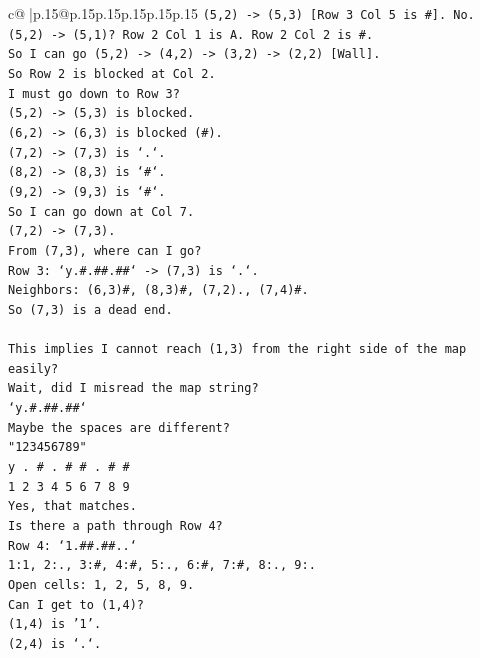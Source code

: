 \documentclass{article}
\begin{document}
{\begin{supertabular}{c@{$\;$}|p{.15\linewidth}@{}p{.15\linewidth}p{.15\linewidth}p{.15\linewidth}p{.15\linewidth}p{.15\linewidth}}
{{{\texttt{(5,2) {-}> (5,3) {[}Row 3 Col 5 is \#{]}. No.} \\
\texttt{(5,2) {-}> (5,1)? Row 2 Col 1 is A. Row 2 Col 2 is \#.} \\
\texttt{So I can go (5,2) {-}> (4,2) {-}> (3,2) {-}> (2,2) {[}Wall{]}.} \\
\texttt{So Row 2 is blocked at Col 2.} \\
\texttt{I must go down to Row 3?} \\
\texttt{(5,2) {-}> (5,3) is blocked.} \\
\texttt{(6,2) {-}> (6,3) is blocked (\#).} \\
\texttt{(7,2) {-}> (7,3) is `.`.} \\
\texttt{(8,2) {-}> (8,3) is `\#`.} \\
\texttt{(9,2) {-}> (9,3) is `\#`.} \\
\texttt{So I can go down at Col 7.} \\
\texttt{(7,2) {-}> (7,3).} \\
\texttt{From (7,3), where can I go?} \\
\texttt{Row 3: `y.\#.\#\#.\#\#` {-}> (7,3) is `.`.} \\
\texttt{Neighbors: (6,3)\#, (8,3)\#, (7,2)., (7,4)\#.} \\
\texttt{So (7,3) is a dead end.} \\
\\ 
\texttt{This implies I cannot reach (1,3) from the right side of the map easily?} \\
\texttt{Wait, did I misread the map string?} \\
\texttt{`y.\#.\#\#.\#\#`} \\
\texttt{Maybe the spaces are different?} \\
\texttt{"123456789"} \\
\texttt{y . \# . \# \# . \# \#} \\
\texttt{1 2 3 4 5 6 7 8 9} \\
\texttt{Yes, that matches.} \\
\texttt{Is there a path through Row 4?} \\
\texttt{Row 4: `1.\#\#.\#\#..`} \\
\texttt{1:1, 2:., 3:\#, 4:\#, 5:., 6:\#, 7:\#, 8:., 9:.} \\
\texttt{Open cells: 1, 2, 5, 8, 9.} \\
\texttt{Can I get to (1,4)?} \\
\texttt{(1,4) is '1'.} \\
\texttt{(2,4) is `.`.} \\
}}}
\end{supertabular}}
\end{document}

